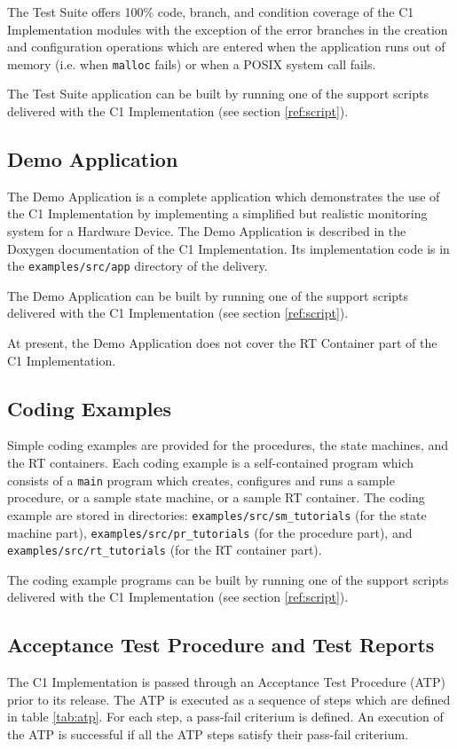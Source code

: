 \documentclass[a4paper,10pt]{article}
\begin{document}
The Test Suite offers 100\% code, branch, and condition coverage of the C1 Implementation modules with the exception of the error branches in the creation and configuration operations which are entered when the application runs out of memory (i.e. when \texttt{malloc} fails) or when a POSIX system call fails.

The Test Suite application can be built by running one of the support scripts delivered with the C1 Implementation (see section \ref{ref:script}). 

\subsection{Demo Application}\label{sec:demoApp}
The Demo Application is a complete application which demonstrates the use of the C1 Implementation by implementing a simplified but realistic monitoring system for a Hardware Device. The Demo Application is described in the Doxygen documentation of the C1 Implementation. Its implementation code is in the \texttt{examples/src/app} directory of the delivery.

The Demo Application can be built by running one of the support scripts delivered with the C1 Implementation (see section \ref{ref:script}). 

At present, the Demo Application does not cover the RT Container part of the C1 Implementation.

\subsection{Coding Examples}\label{sec:codingExamples}
Simple coding examples are provided for the procedures, the state machines, and the RT containers. Each coding example is a self-contained program which consists of a \texttt{main} program which creates, configures and runs a sample procedure, or a sample state machine, or a sample RT container. The coding example are stored in directories: \texttt{examples/src/sm\_tutorials} (for the state machine part), \texttt{examples/src/pr\_tutorials} (for the procedure part), and \texttt{examples/src/rt\_tutorials} (for the RT container part).

The coding example programs can be built by running one of the support scripts delivered with the C1 Implementation (see section \ref{ref:script}). 

\subsection{Acceptance Test Procedure and Test Reports}\label{ref:atp}
The C1 Implementation is passed through an Acceptance Test Procedure (ATP) prior to its release. The ATP is executed as a sequence of steps which are defined in table \ref{tab:atp}. For each step, a pass-fail criterium is defined. An execution of the ATP is successful if all the ATP steps satisfy their pass-fail criterium.
\end{document}
